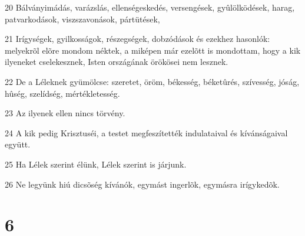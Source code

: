 \par 20 Bálványimádás, varázslás, ellenségeskedés, versengések, gyûlölködések, harag, patvarkodások, viszszavonások, pártütések,
\par 21 Irígységek, gyilkosságok, részegségek, dobzódások és ezekhez hasonlók: melyekrõl elõre mondom néktek, a miképen már ezelõtt is mondottam, hogy a kik ilyeneket cselekesznek, Isten országának örökösei nem lesznek.
\par 22 De a Léleknek gyümölcse: szeretet, öröm, békesség, béketûrés, szívesség, jóság, hûség, szelídség, mértékletesség.
\par 23 Az ilyenek ellen nincs törvény.
\par 24 A kik pedig Krisztuséi, a testet megfeszítették indulataival és kívánságaival együtt.
\par 25 Ha Lélek szerint élünk, Lélek szerint is járjunk.
\par 26 Ne legyünk hiú dicsõség kívánók, egymást ingerlõk, egymásra irígykedõk.

\chapter{6}

